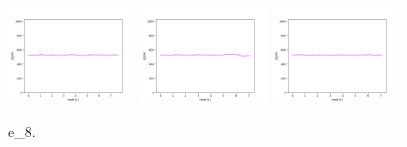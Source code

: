 \begin{figure}[!ht]
\begin{center}
\includegraphics[width=0.3\textwidth]{../data/e_8/e_8_1.png}
\includegraphics[width=0.3\textwidth]{../data/e_8/e_8_2.png}
\includegraphics[width=0.3\textwidth]{../data/e_8/e_8_3.png}
\caption{e\_8.\label{fig:e_8}}
\end{center}
\end{figure}


